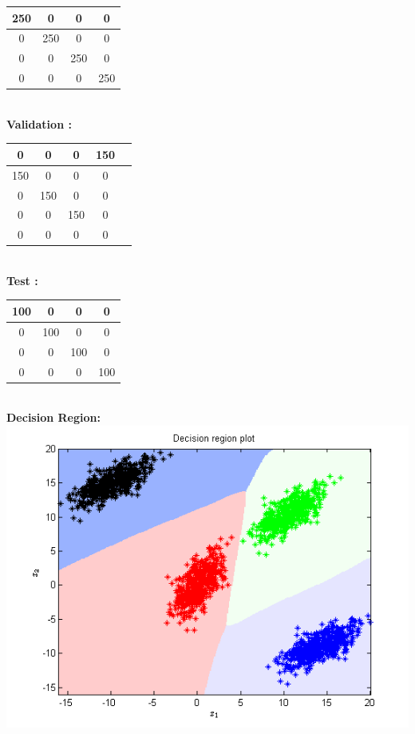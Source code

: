\documentclass{article}
\begin{document}
\begin{flushleft}
\begin{tabular}{|c|c|c|c|} \hline 250 & 0 & 0 & 0\\ \hline 0 & 250 & 0 & 0\\ \hline 0 & 0 & 250 & 0\\ \hline 0 & 0 & 0 & 250 \\ \hline \end{tabular}


\textbf{\\[10pt]Validation :\\[5pt]}

\begin{tabular}{|c|c|c|c|c|} \hline  0 & 0 & 0 & 150\\ \hline 150 & 0 & 0 & 0\\ \hline 0 & 150 & 0 & 0\\ \hline  0 & 0 & 150 & 0\\ \hline 0 & 0 & 0 & 0 \\ \hline \end{tabular}

\textbf{\\[10pt]Test :\\[5pt]}


\begin{tabular}{|c|c|c|c|} \hline 100 & 0 & 0 & 0\\ \hline 0 & 100 & 0 & 0\\ \hline 0 & 0 & 100 & 0\\ \hline 0 & 0 & 0 & 100 \\ \hline \end{tabular}




\textbf{\\[10pt]Decision Region:\\[5pt]}
\includegraphics[scale=1]{Classification/linearlySeparable/decn_region_nn}


\end{flushleft}
\end{document}
